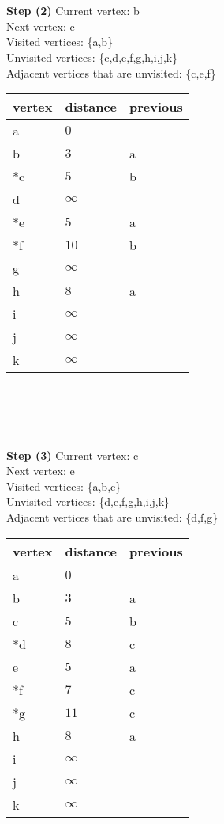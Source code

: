 \documentclass[11pt]{article}
\begin{document}
\\ \\
\textbf{Step (2)} Current vertex: b\\
Next vertex: c\\
Visited vertices: \{a,b\}\\
Unvisited vertices: \{c,d,e,f,g,h,i,j,k\}\\
Adjacent vertices that are unvisited: \{c,e,f\}\\
\begin{tabular}{|l|l|l|}
    \hline
    vertex & distance & previous \\
    \hline
    a & $0$ &  \\
    \hline
    b & $3$ & a \\
    \hline
    *c & $5$ & b \\
    \hline
    d & $\infty$ &  \\
    \hline
    *e & $5$ & a \\
    \hline
    *f & $10$ & b \\
    \hline
    g & $\infty$ &  \\
    \hline
    h & $8$ & a \\
    \hline
    i & $\infty$ &  \\
    \hline
    j & $\infty$ &  \\
    \hline
    k & $\infty$ &  \\
    \hline
\end{tabular}
\\ \\
\\ \\
\textbf{Step (3)} Current vertex: c\\
Next vertex: e\\
Visited vertices: \{a,b,c\}\\
Unvisited vertices: \{d,e,f,g,h,i,j,k\}\\
Adjacent vertices that are unvisited: \{d,f,g\}\\
\begin{tabular}{|l|l|l|}
    \hline
    vertex & distance & previous \\
    \hline
    a & $0$ &  \\
    \hline
    b & $3$ & a \\
    \hline
    c & $5$ & b \\
    \hline
    *d & $8$ & c \\
    \hline
    e & $5$ & a \\
    \hline
    *f & $7$ & c \\
    \hline
    *g & $11$ & c \\
    \hline
    h & $8$ & a \\
    \hline
    i & $\infty$ &  \\
    \hline
    j & $\infty$ &  \\
    \hline
    k & $\infty$ &  \\
    \hline
\end{tabular}
\end{document}

